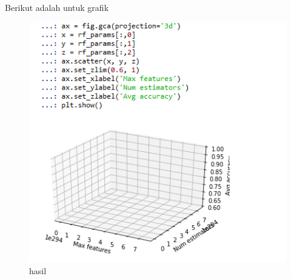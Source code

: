 \begin{enumerate}
\par Berikut adalah untuk grafik

\begin{figure}[H]
\centering
\includegraphics[scale=0.7]{figures/1174031/4/14.PNG}
\caption{hasil}
\label{Praktek no 8 Grafik}
\end{figure}
\end{enumerate}





